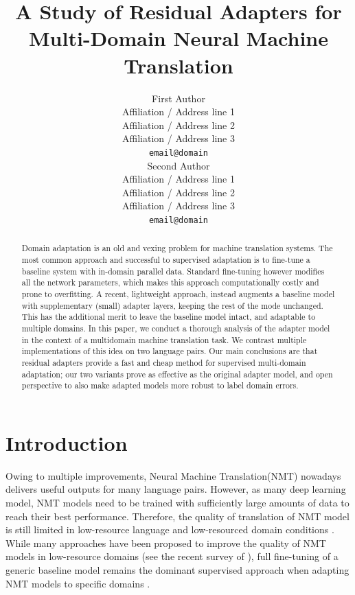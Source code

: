 \documentclass[11pt,a4paper]{article}
\title{A Study of Residual Adapters for Multi-Domain Neural Machine Translation}
\author{First Author \\
  Affiliation / Address line 1 \\
  Affiliation / Address line 2 \\
  Affiliation / Address line 3 \\
  \texttt{email@domain} \\\And
  Second Author \\
  Affiliation / Address line 1 \\
  Affiliation / Address line 2 \\
  Affiliation / Address line 3 \\
  \texttt{email@domain} \\}
\date{}
\newcommand{\fyDone}[1]{\done[FY]\Todo[FY:]{\textcolor{orange}{#1}}}
\newcommand{\mpTodo}[1]{\Todo[MP:]{\textcolor{green}{#1}}}
\newcommand{\mpDone}[1]{\done[MP]\Todo[MP:]{\textcolor{green}{#1}}}
\begin{document}
\maketitle
\begin{abstract}
\fyDone{Citation-free abstract}
Domain adaptation is an old and vexing problem for machine translation systems. The most common approach and successful to supervised adaptation is to fine-tune a baseline system with in-domain parallel data. Standard fine-tuning however modifies all the network parameters, which makes this approach computationally costly and prone to overfitting. A recent, lightweight approach, instead augments a baseline model with supplementary (small) adapter layers, keeping the rest of the mode unchanged. This has the additional merit to leave the baseline model intact, and adaptable to multiple domains. In this paper, we conduct a thorough analysis of the adapter model in the context of a multidomain machine translation task. We contrast multiple implementations of this idea on two language pairs. Our main conclusions are that residual adapters provide a fast and cheap method for supervised multi-domain adaptation; our two variants prove as effective as the original adapter model, and open perspective to also make adapted models more robust to label domain errors.
\fyDone{abstract to be continued}

\end{abstract}
\section{Introduction } \label{sec:intro}
\mpDone{write introduction} \fyDone{Citations in chronological order}\fyDone{Split long sentences}
Owing to multiple improvements, Neural Machine Translation(NMT) \cite{Kalchbrenner13recurrent,Sutskever14sequence,Bahdanau15learning,Vaswani17attention} nowadays delivers useful outputs for many language pairs. However, as many deep learning model, NMT models need to be trained with sufficiently large amounts of data to reach their best performance. Therefore, the quality of translation of NMT model is still limited in low-resource language and low-resourced domain conditions \cite{duh13adaptation,zoph16transfer,koehn17six}. While many approaches have been proposed to improve the quality of NMT models in low-resource domains (see the recent survey of \citet{Chu18asurvey}), full fine-tuning of a generic baseline model remains the dominant supervised approach when adapting NMT models to specific domains \cite{Luong15stanford,neubig18rapid}.
\end{document}

